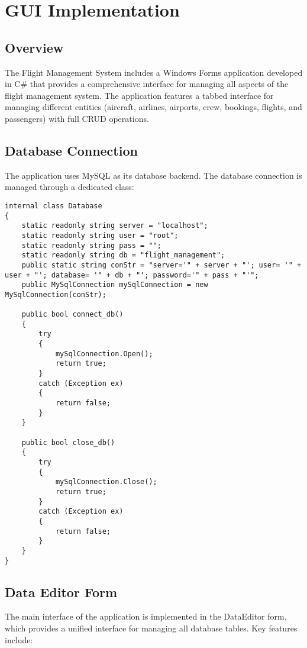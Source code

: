 \documentclass[a4paper,12pt]{article}
\begin{document}
\section{GUI Implementation}
\subsection{Overview}
The Flight Management System includes a Windows Forms application developed in C\# that provides a comprehensive interface for managing all aspects of the flight management system. The application features a tabbed interface for managing different entities (aircraft, airlines, airports, crew, bookings, flights, and passengers) with full CRUD operations.

\subsection{Database Connection}
The application uses MySQL as its database backend. The database connection is managed through a dedicated class:

\begin{lstlisting}[language=CSharp, caption=Database Connection Class]
internal class Database
{
    static readonly string server = "localhost";
    static readonly string user = "root";
    static readonly string pass = "";
    static readonly string db = "flight_management";
    public static string conStr = "server='" + server + "'; user= '" + user + "'; database= '" + db + "'; password='" + pass + "'";
    public MySqlConnection mySqlConnection = new MySqlConnection(conStr);

    public bool connect_db()
    {
        try
        {
            mySqlConnection.Open();
            return true;
        }
        catch (Exception ex)
        {
            return false;
        }
    }

    public bool close_db()
    {
        try
        {
            mySqlConnection.Close();
            return true;
        }
        catch (Exception ex)
        {
            return false;
        }
    }
}
\end{lstlisting}

\subsection{Data Editor Form}
The main interface of the application is implemented in the DataEditor form, which provides a unified interface for managing all database tables. Key features include:
\end{document}
